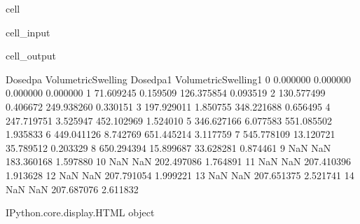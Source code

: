 \documentclass[letterpaper,10pt,english]{jupyterBook}
\begin{document}
\begin{sphinxuseclass}{cell}
\begin{sphinxVerbatimInput}
\begin{sphinxuseclass}{cell_input}
\begin{sphinxVerbatim}[commandchars=\\\{\}]
					\PYG{p}{,}  
				\end{sphinxVerbatim}
				
		\end{sphinxuseclass}\end{sphinxVerbatimInput}
		\begin{sphinxVerbatimOutput}
			
			\begin{sphinxuseclass}{cell_output}
				\begin{sphinxVerbatim}[commandchars=\\\{\}]
					Dosedpa  VolumetricSwelling\PYGZpc{}    Dosedpa1  VolumetricSwelling\PYGZpc{}1
					0     0.000000             0.000000    0.000000              0.000000
					1    71.609245             0.159509  126.375854              0.093519
					2   130.577499             0.406672  249.938260              0.330151
					3   197.929011             1.850755  348.221688              0.656495
					4   247.719751             3.525947  452.102969              1.524010
					5   346.627166             6.077583  551.085502              1.935833
					6   449.041126             8.742769  651.445214              3.117759
					7   545.778109            13.120721   35.789512              0.203329
					8   650.294394            15.899687   33.628281              0.874461
					9          NaN                  NaN  183.360168              1.597880
					10         NaN                  NaN  202.497086              1.764891
					11         NaN                  NaN  207.410396              1.913628
					12         NaN                  NaN  207.791054              1.999221
					13         NaN                  NaN  207.651375              2.521741
					14         NaN                  NaN  207.687076              2.611832
				\end{sphinxVerbatim}
				
				\begin{sphinxVerbatim}[commandchars=\\\{\}]
					\PYGZlt{}IPython.core.display.HTML object\PYGZgt{}
				\end{sphinxVerbatim}
				
				\sphinxAtStartPar
				

\end{sphinxuseclass}
\end{sphinxVerbatimOutput}
\end{sphinxuseclass}
\end{document}
